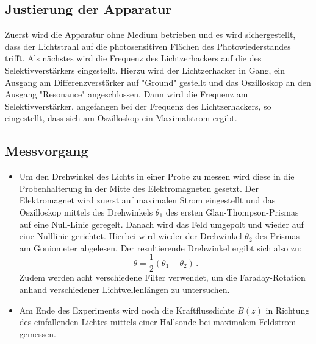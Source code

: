 \subsection{Justierung der Apparatur}
Zuerst wird die Apparatur ohne Medium betrieben und es wird sichergestellt, dass der Lichtstrahl
auf die photosensitiven Flächen des Photowiederstandes trifft. Als nächstes wird die Frequenz
des Lichtzerhackers auf die des Selektivverstärkers eingestellt. Hierzu wird der Lichtzerhacker
in Gang, ein Ausgang am Differenzverstärker auf "Ground" gestellt und das Oszilloskop an den
Ausgang "Resonance" angeschlossen. Dann wird die Frequenz am Selektivverstärker, angefangen
bei der Frequenz des Lichtzerhackers, so eingestellt, dass sich am Oszilloskop ein Maximalstrom
ergibt.
\subsection{Messvorgang}
\begin{itemize}
	\item Um den Drehwinkel des Lichts in einer Probe zu messen wird diese in die Probenhalterung in der Mitte des Elektromagneten gesetzt.
	Der Elektromagnet  wird zuerst auf maximalen Strom eingestellt und das Oszilloskop mittels des Drehwinkels $\theta_1$
		des ersten Glan-Thompson-Prismas auf eine Null-Linie geregelt. Danach wird das
		Feld umgepolt und wieder auf eine Nulllinie gerichtet. Hierbei wird wieder der
		Drehwinkel $\theta_2$ des Prismas am Goniometer abgelesen. Der resultierende
		Drehwinkel ergibt sich also zu:
		\begin{equation*}
			\theta = \frac{1}{2}(\theta_1-\theta_2) \, \mathrm{.}
		\end{equation*}
		Zudem werden acht verschiedene Filter verwendet, um die Faraday-Rotation anhand verschiedener Lichtwellenlängen zu untersuchen.
	\item Am Ende des Experiments wird noch die Kraftflussdichte $B(z)$ in Richtung des
		einfallenden Lichtes mittels einer Hallsonde bei maximalem Feldstrom gemessen.
\end{itemize}
